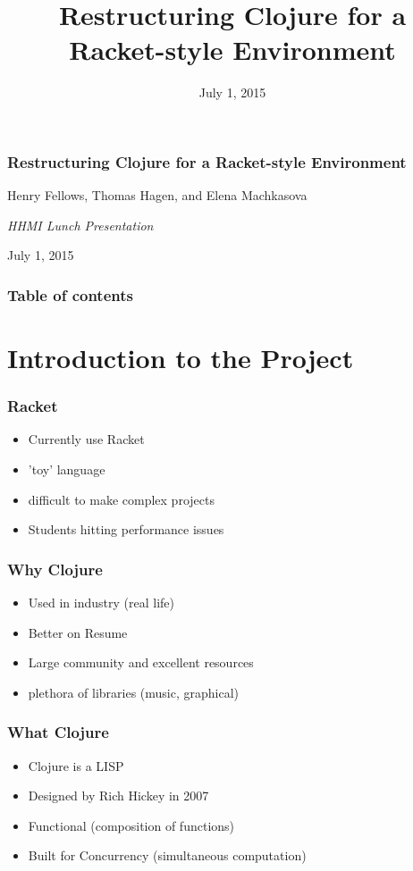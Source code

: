 \documentclass{beamer}
\begin{document}
\title{Restructuring Clojure for a Racket-style Environment}
\date{July 1, 2015}

\begin{frame}
\frametitle {Restructuring Clojure for a Racket-style Environment}
{\centering
\noindent
Henry Fellows, Thomas Hagen, and Elena Machkasova \par

{\it 
HHMI Lunch Presentation\par
July 1, 2015\par}
}
\end{frame}

\begin{frame}
\frametitle{Table of contents}
\tableofcontents  
\end{frame}

\section{Introduction to the Project}

\begin{frame}
	\frametitle{Racket}
	\begin{itemize}
		\item Currently use Racket
		\item 'toy' language
		\item difficult to make complex projects
		\item Students hitting performance issues
	\end{itemize}
\end{frame}

\begin{frame}
	\frametitle{Why Clojure}
	\begin{itemize}
		\item Used in industry (real life)
		\item Better on Resume
		\item Large community and excellent resources
		\item plethora of libraries (music, graphical)
	\end{itemize}
\end{frame}

\begin{frame}
	\frametitle{What Clojure}
	\begin{itemize}
		\item Clojure is a LISP
		\item Designed by Rich Hickey in 2007
		\item Functional (composition of functions)
		\item Built for Concurrency (simultaneous computation)
		
	\end{itemize}
\end{frame}
\end{document}
